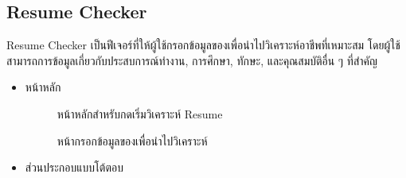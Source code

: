 \subsection {Resume Checker}
Resume Checker เป็นฟีเจอร์ที่ให้ผู้ใช้กรอกข้อมูลของเพื่อนำไปวิเคราะห์อาชีพที่เหมาะสม โดยผู้ใช้สามารถการข้อมูลเกี่ยวกับประสบการณ์ทำงาน, การศึกษา, ทักษะ, และคุณสมบัติอื่น ๆ ที่สำคัญ
\begin{itemize}
    \item หน้าหลัก
    \begin{figure}[H]\centering
    \setlength{\fboxrule}{0.2mm} %
    \setlength{\fboxsep}{0.5cm}
  \caption{\centering หน้าหลักสำหรับกดเริ่มวิเคราะห์ Resume}\label{fig:wireframe1_1}
\end{figure}
 \begin{figure}[H]\centering
    \setlength{\fboxrule}{0.2mm} %
    \setlength{\fboxsep}{0.5cm}
  \caption{\centering หน้ากรอกข้อมูลของเพื่อนำไปวิเคราะห์}\label{fig:wireframe1_2}
\end{figure}
    \item ส่วนประกอบแบบโต้ตอบ
  \begin{figure}[H]\centering
    \setlength{\fboxrule}{0.2mm} %
    \setlength{\fboxsep}{0.5cm}

\end{figure}
\end{itemize}
